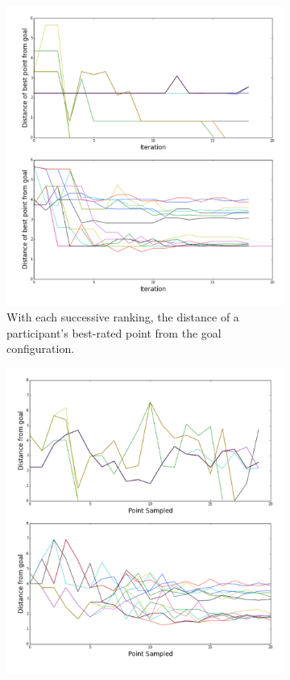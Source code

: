 \begin{figure}
\centering
  \begin{subfigure}[b]{0.48\textwidth}
    \includegraphics[width=\textwidth]{figures/best_distances}
    \caption{%
      With each successive ranking, the distance of a participant's best-rated point from the goal configuration.
    }\label{fig:best_distances}
  \end{subfigure}
  \begin{subfigure}[b]{0.48\textwidth}
    \includegraphics[width=\textwidth]{figures/point_distances}

\end{subfigure}
\end{figure}

